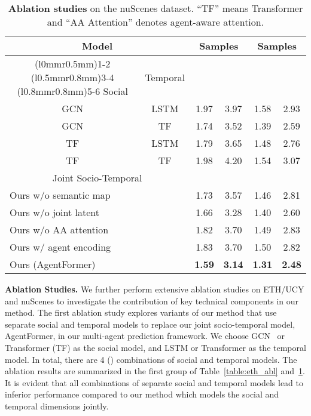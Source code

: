 \documentclass[10pt,twocolumn,letterpaper]{article}
\newcommand{\mname}{AgentFormer}
\begin{document}
\begin{table}[t]
\footnotesize
\centering
\begin{tabular}{@{\hskip 1mm}cc|cccc}
\toprule
\multicolumn{2}{c|}{Model} & \multicolumn{2}{c}{ Samples} & \multicolumn{2}{c}{ Samples}\\
\cmidrule(l{0mm}r{0.5mm}){1-2}
\cmidrule(l{0.5mm}r{0.8mm}){3-4}
\cmidrule(l{0.8mm}r{0.8mm}){5-6}
 \hspace{1.5mm} Social \hspace{1.5mm} & Temporal &  &  &  & \\ \midrule GCN & LSTM & 1.97 & 3.97 & 1.58 & 2.93 \\
GCN & TF & 1.74 & 3.52 & 1.39 & 2.59 \\
TF & LSTM & 1.79 & 3.65 & 1.48 & 2.76 \\
TF & TF & 1.98 & 4.20 & 1.54 & 3.07 \\
\midrule
\multicolumn{2}{c|}{Joint Socio-Temporal} &   &  &  & \\ \midrule \multicolumn{2}{l|}{Ours w/o semantic map}  & 1.73 & 3.57 & 1.46 & 2.81 \\
\multicolumn{2}{l|}{Ours w/o joint latent}  & 1.66 & 3.28 & 1.40 & 2.60 \\
\multicolumn{2}{l|}{Ours w/o AA attention} & 1.82 & 3.70 & 1.49 & 2.83 \\
\multicolumn{2}{l|}{Ours w/ agent encoding} & 1.83 & 3.70 & 1.50 & 2.82 \\
\multicolumn{2}{l|}{Ours (\mname)} & \textbf{1.59} & \textbf{3.14} & \textbf{1.31} & \textbf{2.48} \\
\bottomrule
\end{tabular}
\vspace{1.5mm}
\caption{\textbf{Ablation studies} on the nuScenes dataset. ``TF'' means Transformer and ``AA Attention'' denotes agent-aware attention.}
\label{table:nuscenes_abl}
\vspace{-3mm}
\end{table} 
\vspace{2mm}
\noindent\textbf{Ablation Studies.}
We further perform extensive ablation studies on ETH/UCY and nuScenes to investigate the contribution of key technical components in our method. The first ablation study explores variants of our method that use separate social and temporal models to replace our joint socio-temporal model, \mname, in our multi-agent prediction framework. We choose GCN~\cite{kipf2016semi} or Transformer (TF) as the social model, and LSTM or Transformer as the temporal model. In total, there are 4 () combinations of social and temporal models. The ablation results are summarized in the first group of Table~\ref{table:eth_abl} and~\ref{table:nuscenes_abl}. It is evident that all combinations of separate social and temporal models lead to inferior performance compared to our method which models the social and temporal dimensions jointly. 
\end{document}
